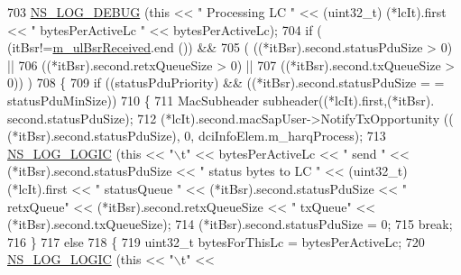 \begin{DoxyCode}
703                                         \hyperlink{group__logging_ga413f1886406d49f59a6a0a89b77b4d0a}{NS\_LOG\_DEBUG} (\textcolor{keyword}{this} << \textcolor{stringliteral}{" Processing LC "} << (uint32\_t)
      (*lcIt).first << \textcolor{stringliteral}{" bytesPerActiveLc "} << bytesPerActiveLc);
704                                         \textcolor{keywordflow}{if} ( (itBsr!=\hyperlink{classns3_1_1MmWaveUeMac_a4fedb11c547b798c1546f082e147ba03}{m\_ulBsrReceived}.end ()) &&
705                                                         ( ((*itBsr).second.statusPduSize > 0) ||
706                                                                         ((*itBsr).second.retxQueueSize > 0)
       ||
707                                                                         ((*itBsr).second.txQueueSize > 0)) 
      )
708                                         \{
709                                                 \textcolor{keywordflow}{if} ((statusPduPriority) && ((*itBsr).second.statusPduSize =
      = statusPduMinSize))
710                                                 \{
711                                                         MacSubheader subheader((*lcIt).first,(*itBsr).
      second.statusPduSize);
712                                                         (*lcIt).second.macSapUser->NotifyTxOpportunity ((
      (*itBsr).second.statusPduSize), 0, dciInfoElem.m\_harqProcess);
713                                                         \hyperlink{group__logging_ga88acd260151caf2db9c0fc84997f45ce}{NS\_LOG\_LOGIC} (\textcolor{keyword}{this} << \textcolor{stringliteral}{"\(\backslash\)t"} << 
      bytesPerActiveLc << \textcolor{stringliteral}{" send  "} << (*itBsr).second.statusPduSize << \textcolor{stringliteral}{" status bytes to LC "} << (uint32\_t)(*lcIt).first 
      << \textcolor{stringliteral}{" statusQueue "} << (*itBsr).second.statusPduSize << \textcolor{stringliteral}{" retxQueue"} << (*itBsr).second.retxQueueSize << \textcolor{stringliteral}{"
       txQueue"} <<  (*itBsr).second.txQueueSize);
714                                                         (*itBsr).second.statusPduSize = 0;
715                                                         \textcolor{keywordflow}{break};
716                                                 \}
717                                                 \textcolor{keywordflow}{else}
718                                                 \{
719                                                         uint32\_t bytesForThisLc = bytesPerActiveLc;
720                                                         \hyperlink{group__logging_ga88acd260151caf2db9c0fc84997f45ce}{NS\_LOG\_LOGIC} (\textcolor{keyword}{this} << \textcolor{stringliteral}{"\(\backslash\)t"} << 

\end{DoxyCode}
